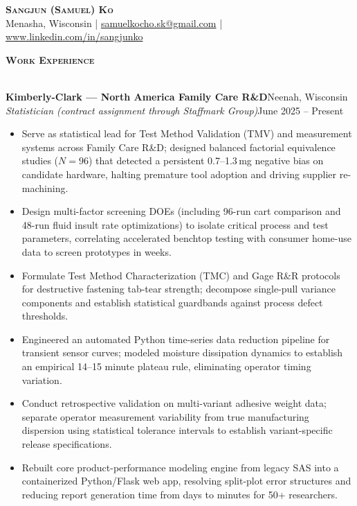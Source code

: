 \documentclass[a4paper]{article}
\newcommand{\lineunder}{
    \vspace*{-8pt} \\
    \hspace*{-18pt} \hrulefill \\
}
\newcommand{\header}[1]{
    \Needspace{4\baselineskip}
    {\hspace*{-18pt}\vspace*{6pt} \textsc{#1}}
    \vspace*{-6pt} \lineunder
}
\newcommand{\role}[4]{
    \Needspace{8\baselineskip}
    \vspace{2pt}
    \textbf{#1}\hfill #2\\
    \textit{#3}\hfill #4\\[-3pt]
}
\begin{document}
\vspace*{-40pt}

\vspace*{-10pt}
\begin{center}
    {\Huge \scshape \textbf{Sangjun (Samuel) Ko}}\\
    Menasha, Wisconsin
    | \href{mailto:samuelkocho.sk@gmail.com}{samuelkocho.sk@gmail.com}
    | \href{https://www.linkedin.com/in/sangjunko}{www.linkedin.com/in/sangjunko}
\end{center}
\vspace*{-8pt}

\header{\textbf{Work Experience}}
\vspace{1mm}

\role{Kimberly-Clark --- North America Family Care R\&D}{Neenah, Wisconsin}
{Statistician (contract assignment through Staffmark Group)}{June 2025 -- Present}
\begin{itemize}[noitemsep]
  \item Serve as statistical lead for Test Method Validation (TMV) and measurement systems across Family Care R\&D; designed balanced factorial equivalence studies ($N=96$) that detected a persistent 0.7--1.3\,mg negative bias on candidate hardware, halting premature tool adoption and driving supplier re-machining.
  \item Design multi-factor screening DOEs (including 96-run cart comparison and 48-run fluid insult rate optimizations) to isolate critical process and test parameters, correlating accelerated benchtop testing with consumer home-use data to screen prototypes in weeks.
  \item Formulate Test Method Characterization (TMC) and Gage R\&R protocols for destructive fastening tab-tear strength; decompose single-pull variance components and establish statistical guardbands against process defect thresholds.
  \item Engineered an automated Python time-series data reduction pipeline for transient sensor curves; modeled moisture dissipation dynamics to establish an empirical 14--15 minute plateau rule, eliminating operator timing variation.
  \item Conduct retrospective validation on multi-variant adhesive weight data; separate operator measurement variability from true manufacturing dispersion using statistical tolerance intervals to establish variant-specific release specifications.
  \item Rebuilt core product-performance modeling engine from legacy SAS into a containerized Python/Flask web app, resolving split-plot error structures and reducing report generation time from days to minutes for 50+ researchers.
\end{itemize}
\end{document}
